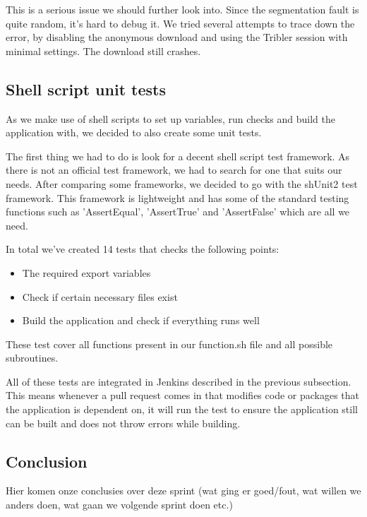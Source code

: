 	This is a serious issue we should further look into. Since the segmentation fault is quite random, it's hard to debug it. We tried several attempts to trace down the error, by disabling the anonymous download and using the Tribler session with minimal settings. The download still crashes.

	\subsection{Shell script unit tests}
		As we make use of shell scripts to set up variables, run checks and build the application with, we decided to also create some unit tests.
		
		The first thing we had to do is look for a decent shell script test framework. As there is not an official test framework, we had to search for one that suits our needs. After comparing some frameworks, we decided to go with the shUnit2 test framework. This framework is lightweight and has some of the standard testing functions such as 'AssertEqual', 'AssertTrue' and 'AssertFalse' which are all we need. 
		
		In total we've created 14 tests that checks the following points:
		
		\begin{itemize}
			\item The required export variables
			\item Check if certain necessary files exist
			\item Build the application and check if everything runs well
		\end{itemize}
		
		These test cover all functions present in our function.sh file and all possible subroutines. 
		
		All of these tests are integrated in Jenkins described in the previous subsection. This means whenever a pull request comes in that modifies code or packages that the application is dependent on, it will run the test to ensure the application still can be built and does not throw errors while building.
	
	\subsection{Conclusion}
		Hier komen onze conclusies over deze sprint (wat ging er goed/fout, wat willen we anders doen, wat gaan we volgende sprint doen etc.)
